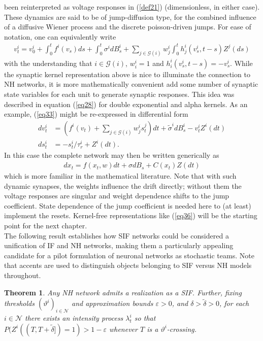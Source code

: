 \documentclass[12pt, oneside]{report}
\newcommand{\1}[1]{\mathbbm{1}_{\{#1\}}}
\newcommand{\mc}[1]{\mathcal{#1}}
\newtheorem{theorem}{Theorem}[section]
\theoremstyle{definition}
\begin{document}
been reinterpreted as voltage responses in (\ref{def21}) (dimensionless, in
either case). These dynamics are said to be of jump-diffusion type, for the
combined influence of a diffusive Wiener process and the discrete poisson-driven
jumps. For ease of notation, one can equivalently write
\begin{align}
    v^i_t=v^i_0+\int_0^tf^i(v_s)ds+\int_0^t\sigma^idB^i_s+\sum_{j\in\mc{G}(i)}w^i_j\int_0^th^i_j(v^i_s,t-s)Z^j(ds)\label{eq33}
\end{align}
with the understanding that $i\in\mc{G}(i)$, $w^i_i=1$ and
$h^i_i(v^i_s,t-s)=-v^i_s$. While the synaptic kernel representation above is
nice to illuminate the connection to NH networks, it is more mathematically
convenient add some number of synaptic state variables for each unit to generate
synaptic responses. This idea was described in equation (\ref{eq28}) for double
exponential and alpha kernels. As an example, (\ref{eq33}) might be re-expressed
in differential form
\begin{align}
    dv^i_t&=\left(f^i(v_t)+\sum_{j\in\mc{G}(i)}w^i_js^j_t\right)dt+\tilde{\sigma}^idB^i_s-v^i_tZ^i(dt)\label{eq34}\\
    ds^i_t&=-s^i_t/\tau_r^i+Z^i(dt).\label{eq35}
\end{align}
In this case the complete network may then be written generically as
\begin{align}
    dx_t=f(x_t, w)dt+\sigma dB_s+C(x_t)Z(dt)\label{eq36}
\end{align}
which is more familiar in the mathematical literature. Note that with such
dynamic synapses, the weights influence the drift directly; without them the
voltage responses are singular and weight dependence shifts to the jump
coefficient. State dependence of the jump coefficient is needed here to (at
least) implement the resets. Kernel-free representations like (\ref{eq36}) will
be the starting point for the next chapter.\\[5pt]
\indent The following result establishes how SIF networks could be considered a
unification of IF and NH networks, making them a particularly appealing
candidate for a pilot formulation of neuronal networks as stochastic teams. Note
that accents are used to distinguish objects belonging to SIF versus NH models
throughout. 
\begin{theorem}\label{thm2} Any NH network admits a realization as a SIF.
    Further, fixing thresholds $(\vartheta^i)_{i\in\mc{N}}$ and approximation bounds $\varepsilon>0$,
    and $\delta>\tilde{\delta}>0$, for each $i\in\mc{N}$ there exists an intensity process $\lambda^i_t$
    so that $P(Z^i((T,T+\tilde{\delta}])=1)>1-\varepsilon$ whenever $T$ is a $\vartheta^i$-crossing.
\end{theorem}
\end{document}
